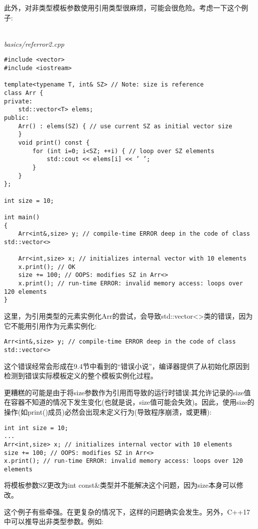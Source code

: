 此外，对非类型模板参数使用引用类型很麻烦，可能会很危险。考虑一下这个例子:

\hspace*{\fill} \\ %
\noindent
\textit{basics/referror2.cpp}
\begin{lstlisting}[style=styleCXX]
#include <vector>
#include <iostream>

template<typename T, int& SZ> // Note: size is reference
class Arr {
private:
	std::vector<T> elems;
public:
	Arr() : elems(SZ) { // use current SZ as initial vector size
	}
	void print() const {
		for (int i=0; i<SZ; ++i) { // loop over SZ elements
			std::cout << elems[i] << ’ ’;
		}
	}
};

int size = 10;

int main()
{
	Arr<int&,size> y; // compile-time ERROR deep in the code of class std::vector<>

	Arr<int,size> x; // initializes internal vector with 10 elements
	x.print(); // OK
	size += 100; // OOPS: modifies SZ in Arr<>
	x.print(); // run-time ERROR: invalid memory access: loops over 120 elements
}
\end{lstlisting}

这里，为引用类型的元素实例化Arr的尝试，会导致std::vector<>类的错误，因为它不能用引用作为元素实例化:

\begin{lstlisting}[style=styleCXX]
Arr<int&,size> y; // compile-time ERROR deep in the code of class std::vector<>
\end{lstlisting}

这个错误经常会形成在9.4节中看到的“错误小说”，编译器提供了从初始化原因到检测到错误实际模板定义的整个模板实例化过程。

更糟糕的可能是由于将size参数作为引用而导致的运行时错误:其允许记录的size值在容器不知道的情况下发生变化(也就是说，size值可能会失效)。因此，使用size的操作(如print()成员)必然会出现未定义行为(导致程序崩溃，或更糟):

\begin{lstlisting}[style=styleCXX]
int int size = 10;
...
Arr<int,size> x; // initializes internal vector with 10 elements
size += 100; // OOPS: modifies SZ in Arr<>
x.print(); // run-time ERROR: invalid memory access: loops over 120 elements
\end{lstlisting}

将模板参数SZ更改为int const\&类型并不能解决这个问题，因为size本身可以修改。

这个例子有些牵强。在更复杂的情况下，这样的问题确实会发生。另外，C++17中可以推导出非类型参数。例如:

